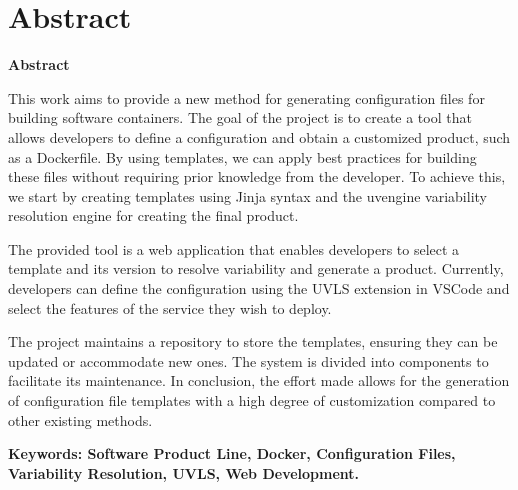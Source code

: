 \documentclass[../main.tex]{subfiles}
\begin{document}
\makeatletter
\renewenvironment{abstract}{%
    \if@twocolumn
      \section*{Abstract \\}%
    \else %
    \begin{flushright}
        {\filleft\Huge\bfseries\fontsize{48pt}{12}\selectfont Abstract\vspace{\z@}}%
        \end{flushright}
      \quotation
    \fi}
    {\if@twocolumn\else\endquotation\fi}
\makeatother
\begin{abstract}

  This work aims to provide a new method for generating configuration files for building software containers. The goal of the project is to create a tool that allows developers to define a configuration and obtain a customized product, such as a Dockerfile. By using templates, we can apply best practices for building these files without requiring prior knowledge from the developer. To achieve this, we start by creating templates using Jinja syntax and the uvengine variability resolution engine for creating the final product.

  The provided tool is a web application that enables developers to select a template and its version to resolve variability and generate a product. Currently, developers can define the configuration using the UVLS extension in VSCode and select the features of the service they wish to deploy.
  
  The project maintains a repository to store the templates, ensuring they can be updated or accommodate new ones. The system is divided into components to facilitate its maintenance. In conclusion, the effort made allows for the generation of configuration file templates with a high degree of customization compared to other existing methods.

\bfseries{\large{Keywords:}} Software Product Line, Docker, Configuration Files, Variability Resolution, UVLS, Web Development.

\end{abstract}
\end{document}
